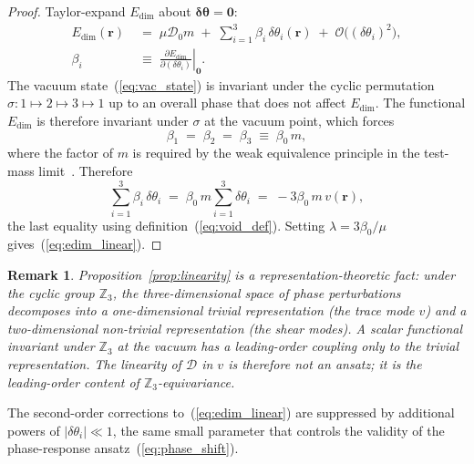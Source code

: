 \documentclass[a4paper,fleqn]{cas-dc}
\theoremstyle{thmstyleone}%
\theoremstyle{thmstyletwo}%
\newtheorem{remark}{Remark}%
\begin{document}
\begin{proof}
Taylor-expand $E_{\mathrm{dim}}$ about $\boldsymbol{\delta\theta}
=\mathbf{0}$:
\begin{equation}
\begin{split}
    E_{\mathrm{dim}}(\mathbf{r})
    &\;=\;
    \mu\mathcal{D}_0 m
    \;+\;
    \sum_{i=1}^{3}
    \beta_i\,\delta\theta_i(\mathbf{r})
    \;+\;
    \mathcal{O}\!\bigl((\delta\theta_i)^2\bigr), \\
    \beta_i
    &\;\equiv\;
    \left.\frac{\partial E_{\mathrm{dim}}}
    {\partial(\delta\theta_i)}\right|_{\mathbf{0}}.
\end{split}
\end{equation}
The vacuum state~(\ref{eq:vac_state}) is invariant under the
cyclic permutation $\sigma\colon 1\mapsto 2\mapsto 3\mapsto 1$
up to an overall phase that does not affect $E_{\mathrm{dim}}$.
The functional $E_{\mathrm{dim}}$ is therefore invariant under
$\sigma$ at the vacuum point, which forces
\begin{equation}
    \beta_1 \;=\; \beta_2 \;=\; \beta_3
    \;\equiv\; \beta_0\,m,
\end{equation}
where the factor of $m$ is required by the weak equivalence
principle in the test-mass limit~\cite{Will2014}. Therefore
\begin{equation}
    \sum_{i=1}^{3}\beta_i\,\delta\theta_i
    \;=\;
    \beta_0\,m\sum_{i=1}^{3}\delta\theta_i
    \;=\;
    -3\beta_0\,m\,v(\mathbf{r}),
\end{equation}
the last equality using definition~(\ref{eq:void_def}). Setting
$\lambda=3\beta_0/\mu$ gives~(\ref{eq:edim_linear}).
\end{proof}

\begin{remark}
\label{rem:rep_theory}
Proposition~\ref{prop:linearity} is a representation-theoretic
fact: under the cyclic group $\mathbb{Z}_3$, the
three-dimensional space of phase perturbations decomposes into
a one-dimensional trivial representation (the trace mode $v$)
and a two-dimensional non-trivial representation (the shear
modes). A scalar functional invariant under $\mathbb{Z}_3$ at
the vacuum has a leading-order coupling only to the trivial
representation. The linearity of $\mathcal{D}$ in $v$ is
therefore not an ansatz; it is the leading-order content of
$\mathbb{Z}_3$-equivariance.
\end{remark}

The second-order corrections to~(\ref{eq:edim_linear}) are
suppressed by additional powers of $|\delta\theta_i|\ll 1$, the
same small parameter that controls the validity of the
phase-response ansatz~(\ref{eq:phase_shift}).
\end{document}
